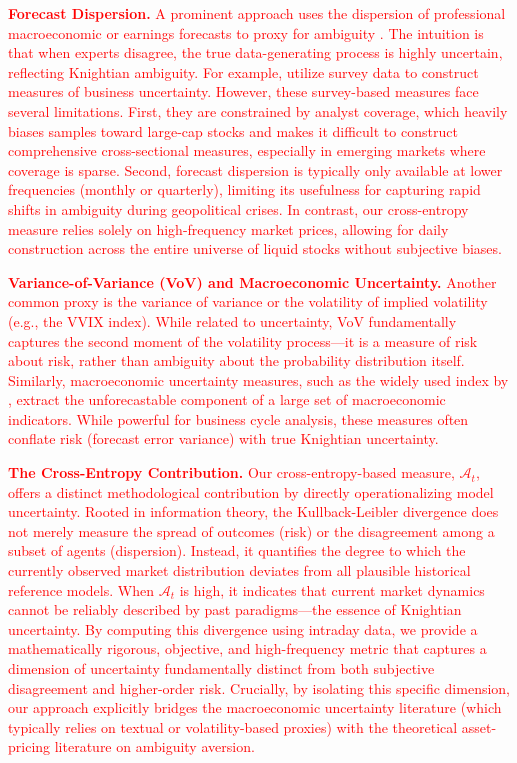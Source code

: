 \documentclass[preprint,12pt,authoryear]{elsarticle}
\begin{document}
\textcolor{red}{\textbf{Forecast Dispersion.} A prominent approach uses the dispersion of professional macroeconomic or earnings forecasts to proxy for ambiguity \citep{Ulrich2013, Brenner2018}. The intuition is that when experts disagree, the true data-generating process is highly uncertain, reflecting Knightian ambiguity. For example, \citet{Bachmann2013} utilize survey data to construct measures of business uncertainty. However, these survey-based measures face several limitations. First, they are constrained by analyst coverage, which heavily biases samples toward large-cap stocks and makes it difficult to construct comprehensive cross-sectional measures, especially in emerging markets where coverage is sparse. Second, forecast dispersion is typically only available at lower frequencies (monthly or quarterly), limiting its usefulness for capturing rapid shifts in ambiguity during geopolitical crises. In contrast, our cross-entropy measure relies solely on high-frequency market prices, allowing for daily construction across the entire universe of liquid stocks without subjective biases.}

\textcolor{red}{\textbf{Variance-of-Variance (VoV) and Macroeconomic Uncertainty.} Another common proxy is the variance of variance or the volatility of implied volatility (e.g., the VVIX index). While related to uncertainty, VoV fundamentally captures the second moment of the volatility process—it is a measure of risk about risk, rather than ambiguity about the probability distribution itself. Similarly, macroeconomic uncertainty measures, such as the widely used index by \citet{Jurado2015}, extract the unforecastable component of a large set of macroeconomic indicators. While powerful for business cycle analysis, these measures often conflate risk (forecast error variance) with true Knightian uncertainty.}

\textcolor{red}{\textbf{The Cross-Entropy Contribution.} Our cross-entropy-based measure, $\mathcal{A}_t$, offers a distinct methodological contribution by directly operationalizing model uncertainty. Rooted in information theory, the Kullback-Leibler divergence does not merely measure the spread of outcomes (risk) or the disagreement among a subset of agents (dispersion). Instead, it quantifies the degree to which the currently observed market distribution deviates from all plausible historical reference models. When $\mathcal{A}_t$ is high, it indicates that current market dynamics cannot be reliably described by past paradigms—the essence of Knightian uncertainty. By computing this divergence using intraday data, we provide a mathematically rigorous, objective, and high-frequency metric that captures a dimension of uncertainty fundamentally distinct from both subjective disagreement and higher-order risk. Crucially, by isolating this specific dimension, our approach explicitly bridges the macroeconomic uncertainty literature (which typically relies on textual or volatility-based proxies) with the theoretical asset-pricing literature on ambiguity aversion.}
\end{document}
